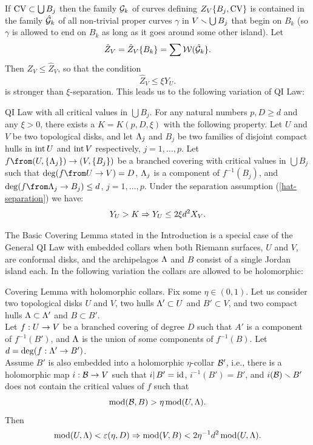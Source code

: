 If $\mathrm{CV}\subset \bigcup B_j$ then the family ${\cal G}_k$  of curves defining $Z_V\{B_j, \mathrm{CV} \}$
is contained in the family $\hat{{\cal G}}_k$ of all non-trivial proper curves $\gamma$ in $V\smallsetminus \bigcup B_j$
that begin on $B_k$ (so $\gamma$ is  allowed to end on $B_k$ as long as it goes around some
other island). Let 
$$  
   \hat Z_V = \hat Z_V\{B_k\}=\sum {\cal W}(\hat {{\cal G}}_k\}.
$$
Then  $ Z_V \leq \hat Z_V $,  so that the condition 
\begin{equation}\label{hat-separation}
  \hat Z_V \leq \xi Y_U .
\end{equation}
is stronger than $\xi$-separation.
This leads us to the following variation of QI Law:
  

\proclaim QI Law with all critical values in $\bigcup B_j$. 
For any natural numbers $p, D\geq d$ and any  $\xi>0$, 
there exists a $K=K(p,D,\xi)$ with the following property.  
Let $U$ and $V$ be two topological disks,
and let ${\Lambda}_j$ and $B_j$ be two families of disjoint compact hulls in $\operatorname{int} U$ and $\operatorname{int} V$ 
respectively, $j=1,\dots, p$.
Let  $f\from (U,  \{\La_j\} )\to (V, \{ B_j\})$  be a branched covering 
with critical values in $\bigcup B_j$ such that 
 $\deg(f\from U\to V) = D$,
${\Lambda}_j$ is a component of $f^{-1}(B_j)$, and  $\deg (f\from \La_j\to B_j)\leq d$, $j=1,\dots, p$.
Under the separation assumption (\ref{hat-separation}) 
we have: 
$$
    Y_U  > K \Rightarrow Y_U   \leq 2\xi d^2 X_V .
$$



 The Basic Covering Lemma
  stated in the Introduction is a special case of the General QI Law with embedded collars
 when both Riemann surfaces, $U$ and $V$, are conformal disks, and the archipelagos ${\Lambda}$ and $B$ consist
of a single Jordan island each. 
In the following variation the collars are allowed to be holomorphic:  

 \proclaim Covering Lemma with holomorphic collars.
Fix some  $\eta\in (0,1)$. Let us consider
two topological disks $U$ and $V$, two hulls ${\Lambda}'\subset U$ and $B'\subset V$,
and two compact hulls ${\Lambda}\subset {\Lambda}'$ and $B\subset B'$.
\\
  Let $f: U \rightarrow  V$ be a branched covering of degree $D$ such that
$A'$ is a component of $f^{-1}(B')$, and ${\Lambda}$ is the union of some components of $f^{-1}(B)$.
Let $d=\deg(f : {\Lambda}'\rightarrow B')$.\\
Assume  $B'$ is also embedded into a holomorphic $\eta$-collar ${\cal B}'$, i.e., 
 there is a holomorphic map $i: {\cal B} \rightarrow V$ such that
$i|\, B'=\operatorname{id}$, $i^{-1}(B')=B'$,
 and $i({\cal B}) \smallsetminus B'$ does not contain the critical values of $f$  
such that
$$
   \operatorname{mod}({\cal B}, B) > \eta \operatorname{mod}(U,  {\Lambda}).
$$
Then 
$$
   \operatorname{mod}(U, {\Lambda}) < {\varepsilon}(\eta, D)  \Rightarrow   \operatorname{mod} (V, B)  <  2\eta^{-1} d^2 \operatorname{mod}(U,  {\Lambda}).
$$


